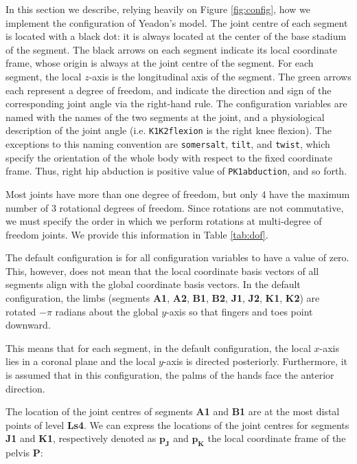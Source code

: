 \documentclass[10pt]{article}
\begin{document}
 In this section we describe, relying heavily on Figure \ref{fig:config}, how
 we implement the configuration of Yeadon's model. The joint centre of each
 segment is located with a black dot: it is always located at the center of the
 base stadium of the segment. The black arrows on each segment indicate its
 local coordinate frame, whose origin is always at the joint centre of the
 segment. For each segment, the local $z$-axis is the longitudinal axis of the
 segment. The green arrows each represent a degree of freedom, and indicate the
 direction and sign of the corresponding joint angle via the right-hand rule.
 The configuration variables are named with the names of the two segments at
 the joint, and a physiological description of the joint angle (i.e.
 \verb+K1K2flexion+ is the right knee flexion). The exceptions to this naming
 convention are \verb+somersalt+, \verb+tilt+, and \verb+twist+, which specify
 the orientation of the whole body with respect to the fixed coordinate frame.
 Thus, right hip abduction is positive value of \verb+PK1abduction+, and so
 forth.

Most joints have more than one degree of freedom, but only 4 have the maximum
number of 3 rotational degrees of freedom. Since rotations are not commutative,
we must specify the order in which we perform rotations at multi-degree of
freedom joints. We provide this information in Table \ref{tab:dof}.

The default configuration is for all configuration variables to have a value of
zero. This, however, does not mean that the local coordinate basis vectors of
all segments align with the global coordinate basis vectors. In the default
configuration, the limbs (segments \textbf{A1}, \textbf{A2}, \textbf{B1},
\textbf{B2}, \textbf{J1}, \textbf{J2}, \textbf{K1}, \textbf{K2}) are rotated
$-\pi$ radians about the global $y$-axis
so that fingers and toes point downward.

This means that for each segment, in the default configuration, the local
$x$-axis lies in a coronal plane and the local $y$-axis is directed
posteriorly. Furthermore, it is assumed that in this configuration, the palms
of the hands face the anterior direction.

The location of the joint centres of segments \textbf{A1} and \textbf{B1} are
at the most distal points of level \textbf{Ls4}. We can express the locations of the joint
centres for segments \textbf{J1} and \textbf{K1}, respectively denoted as
$\mathbf{p_J}$ and $\mathbf{p_K}$ the local coordinate
frame of the pelvis \textbf{P}:
\end{document}

